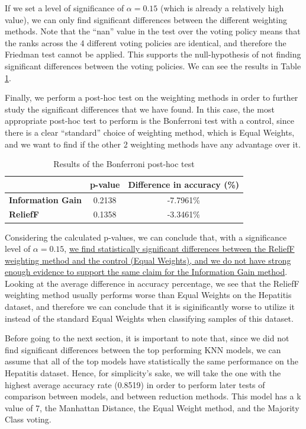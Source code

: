 If we set a level of significance of $ \alpha = 0.15 $ (which is already a relatively high value), we can only find significant differences between the different weighting methods. Note that the ``nan'' value in the test over the voting policy means that the ranks across the 4 different voting policies are identical, and therefore the Friedman test cannot be applied. This supports the null-hypothesis of not finding significant differences between the voting policies. We can see the results in Table \ref{tab:knn:hep:posthoc}.

Finally, we perform a post-hoc test on the weighting methods in order to further study the significant differences that we have found. In this case, the most appropriate post-hoc test to perform is the Bonferroni test with a control, since there is a clear ``standard'' choice of weighting method, which is Equal Weights, and we want to find if the other 2 weighting methods have any advantage over it.
\begin{table}[h!]
    \centering
    \small
    \begin{tabular}{|l|c|c|}
    \hline
                             & \textbf{p-value} & \textbf{Difference in accuracy (\%)} \\ \hline
    \textbf{Information Gain} & 0.2138           & -7.7961\%          \\ \hline
    \textbf{ReliefF}           & 0.1358           & -3.3461\%          \\ \hline
    \end{tabular}
    \caption{Results of the Bonferroni post-hoc test}
    \label{tab:knn:hep:posthoc}
\end{table}

Considering the calculated p-values, we can conclude that, with a significance level of $ \alpha = 0.15 $, \uline{we find statistically significant differences between the ReliefF weighting method and the control (Equal Weights), and we do not have strong enough evidence to support the same claim for the Information Gain method}. Looking at the average difference in accuracy percentage, we see that the ReliefF weighting method usually performs worse than Equal Weights on the Hepatitis dataset, and therefore we can conclude that it is siginificantly worse to utilize it instead of the standard Equal Weights when classifying samples of this dataset.

Before going to the next section, it is important to note that, since we did not find significant differences between the top performing KNN models, we can assume that all of the top models have statistically the same performance on the Hepatitis dataset. Hence, for simplicity's sake, we will take the one with the highest average accuracy rate (0.8519) in order to perform later tests of comparison between models, and between reduction methods. This model has a k value of 7, the Manhattan Distance, the Equal Weight method, and the Majority Class voting.

